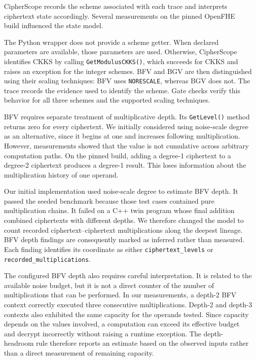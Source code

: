 \documentclass[sigconf,nonacm]{acmart}
\begin{document}
CipherScope records the scheme associated with each trace and interprets
ciphertext state accordingly. Several measurements on the pinned OpenFHE
build influenced the state model.

The Python wrapper does not provide a scheme getter. When declared parameters
are available, those parameters are used. Otherwise, CipherScope identifies
CKKS by calling \texttt{GetModulusCKKS()}, which succeeds for CKKS and raises
an exception for the integer schemes. BFV and BGV are then distinguished
using their scaling techniques: BFV uses \texttt{NORESCALE}, whereas BGV does
not. The trace records the evidence used to identify the scheme. Gate checks
verify this behavior for all three schemes and the supported scaling
techniques.

BFV requires separate treatment of multiplicative depth. Its
\texttt{GetLevel()} method returns zero for every ciphertext. We initially
considered using noise-scale degree as an alternative, since it begins at one
and increases following multiplication. However, measurements showed that the
value is not cumulative across arbitrary computation paths. On the pinned
build, adding a degree-1 ciphertext to a degree-2 ciphertext produces a
degree-1 result. This loses information about the multiplication history of
one operand.

Our initial implementation used noise-scale degree to estimate BFV depth. It
passed the seeded benchmark because those test cases contained pure
multiplication chains. It failed on a C++ twin program whose final addition
combined ciphertexts with different depths. We therefore changed the model to
count recorded ciphertext--ciphertext multiplications along the deepest
lineage. BFV depth findings are consequently marked as inferred rather than
measured. Each finding identifies its coordinate as either
\texttt{ciphertext\_levels} or \texttt{recorded\_multiplications}.

The configured BFV depth also requires careful interpretation. It is related
to the available noise budget, but it is not a direct counter of the number
of multiplications that can be performed. In our measurements, a depth-2 BFV
context correctly executed three consecutive multiplications. Depth-2 and
depth-3 contexts also exhibited the same capacity for the operands tested.
Since capacity depends on the values involved, a computation can exceed its
effective budget and decrypt incorrectly without raising a runtime exception.
The depth-headroom rule therefore reports an estimate based on the observed
inputs rather than a direct measurement of remaining capacity.
\end{document}
